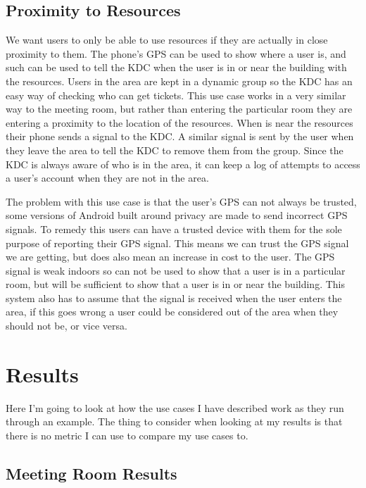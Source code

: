\documentclass[]{report}   %
\begin{document}
\subsection{Proximity to Resources}
We want users to only be able to use resources if they are actually in close proximity to them. The phone's GPS can be used to show where a user is, and such can be used to tell the KDC when the user is in or near the building with the resources. Users in the area are kept in a dynamic group so the KDC has an easy way of checking who can get tickets. This use case works in a very similar way to the meeting room, but rather than entering the particular room they are entering a proximity to the location of the resources. When is near the resources their phone sends a signal to the KDC. A similar signal is sent by the user when they leave the area to tell the KDC to remove them from the group. Since the KDC is always aware of who is in the area, it can keep a log of attempts to access a user's account when they are not in the area.

The problem with this use case is that the user's GPS can not always be trusted, some versions of Android built around privacy are made to send incorrect GPS signals. To remedy this users can have a trusted device with them for the sole purpose of reporting their GPS signal. This means we can trust the GPS signal we are getting, but does also mean an increase in cost to the user. The GPS signal is weak indoors so can not be used to show that a user is in a particular room, but will be sufficient to show that a user is in or near the building. This system also has to assume that the signal is received when the user enters the area, if this goes wrong a user could be considered out of the area when they should not be, or vice versa.


\section{Results}
Here I'm going to look at how the use cases I have described work as they run through an example. The thing to consider when looking at my results is that there is no metric I can use to compare my use cases to.

\subsection{Meeting Room Results}
\end{document}
